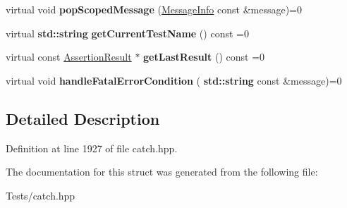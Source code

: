 \begin{DoxyCompactItemize}
virtual void {\bfseries pop\+Scoped\+Message} (\hyperlink{struct_catch_1_1_message_info}{Message\+Info} const \&message)=0
\item 
\mbox{\label{struct_catch_1_1_i_result_capture_aea1617f4a84cc648246aa3ed6918b5bf}} 
virtual \textbf{ std\+::string} {\bfseries get\+Current\+Test\+Name} () const =0
\item 
\mbox{\label{struct_catch_1_1_i_result_capture_ab18872c89fab97405a56e9c6a4919736}} 
virtual const \hyperlink{class_catch_1_1_assertion_result}{Assertion\+Result} $\ast$ {\bfseries get\+Last\+Result} () const =0
\item 
\mbox{\label{struct_catch_1_1_i_result_capture_a7d995222301e6605f26549726b30c3ee}} 
virtual void {\bfseries handle\+Fatal\+Error\+Condition} (\textbf{ std\+::string} const \&message)=0
\end{DoxyCompactItemize}


\subsection{Detailed Description}


Definition at line 1927 of file catch.\+hpp.



The documentation for this struct was generated from the following file\+:\begin{DoxyCompactItemize}
\item 
Tests/catch.\+hpp\end{DoxyCompactItemize}
